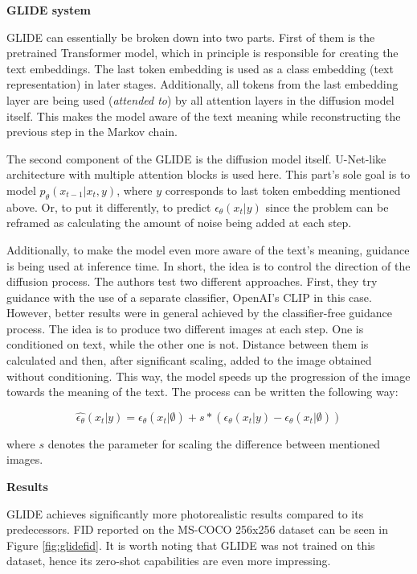 \documentclass[
]{krantz}
\renewenvironment{quote}{\begin{VF}}{\end{VF}}
\begin{document}
\textbf{GLIDE system}

GLIDE can essentially be broken down into two parts. First of them is the pretrained Transformer model, which in principle is responsible for creating the text embeddings. The last token embedding is used as a class embedding (text representation) in later stages. Additionally, all tokens from the last embedding layer are being used (\emph{attended to}) by all attention layers in the diffusion model itself. This makes the model aware of the text meaning while reconstructing the previous step in the Markov chain.

The second component of the GLIDE is the diffusion model itself. U-Net-like architecture with multiple attention blocks is used here. This part's sole goal is to model \(p_{\theta}(x_{t-1}|x_{t},y)\), where \(y\) corresponds to last token embedding mentioned above. Or, to put it differently, to predict \(\epsilon_{\theta}(x_{t}|y)\) since the problem can be reframed as calculating the amount of noise being added at each step.

Additionally, to make the model even more aware of the text's meaning, guidance is being used at inference time. In short, the idea is to control the direction of the diffusion process. The authors test two different approaches. First, they try guidance with the use of a separate classifier, OpenAI's CLIP in this case. However, better results were in general achieved by the classifier-free guidance process. The idea is to produce two different images at each step. One is conditioned on text, while the other one is not. Distance between them is calculated and then, after significant scaling, added to the image obtained without conditioning. This way, the model speeds up the progression of the image towards the meaning of the text. The process can be written the following way:

\begin{quote}
\[\hat{\epsilon_{\theta}}(x_{t}|y)=\epsilon_{\theta}(x_{t}|\emptyset)+s*(\epsilon_{\theta}(x_{t}|y)-\epsilon_{\theta}(x_{t}|\emptyset))\]
\end{quote}

where \(s\) denotes the parameter for scaling the difference between mentioned images.

\textbf{Results}

GLIDE achieves significantly more photorealistic results compared to its predecessors. FID reported on the MS-COCO 256x256 dataset can be seen in Figure \ref{fig:glidefid}. It is worth noting that GLIDE was not trained on this dataset, hence its zero-shot capabilities are even more impressing.
\end{document}
